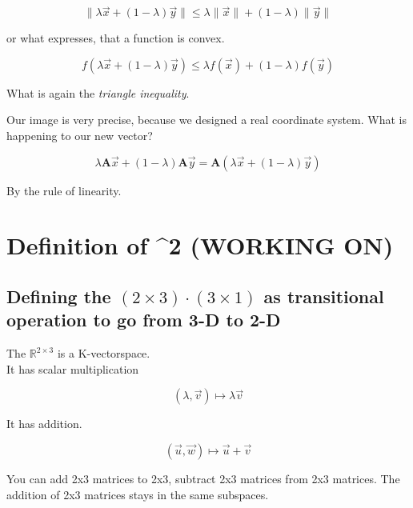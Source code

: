 \documentclass[a4paper]{article}
\begin{document}
\begin{Example}
\begin{displaymath}
\|\lambda\vec{x} + (1-\lambda)\vec{y}\| \leq \lambda\|\vec{x}\| + (1-\lambda)\|\vec{y}\|
\end{displaymath}

or what expresses, that a function is convex.

\begin{displaymath}
f(\lambda\vec{x} + (1-\lambda)\vec{y}) \leq \lambda f(\vec{x}) + (1-\lambda)f(\vec{y})
\end{displaymath}

What is again the \emph{triangle inequality}.

Our image is very precise, because we designed a real coordinate system. What is happening to our new vector? 

\begin{displaymath}
\lambda\boldsymbol{A}\vec{x} + (1-\lambda)\boldsymbol{A}\vec{y} = \boldsymbol{A}(\lambda\vec{x} + (1-\lambda)\vec{y})
\end{displaymath}

By the rule of linearity.


\section{Definition of ^{2} (WORKING ON)}


\subsection{Defining the $(2\times3)\cdot(3\times1)$ as transitional operation to go from 3-D to 2-D}

The $\mathbb{R}^{2\times3}$ is a K-vectorspace. \\

It has scalar multiplication

\begin{displaymath}
(\lambda, \vec{v}) \mapsto \lambda\vec{v} 
\end{displaymath}

It has addition.

\begin{displaymath}
(\vec{u}, \vec{w}) \mapsto \vec{u} + \vec{v}
\end{displaymath}

You can add 2x3 matrices to 2x3, subtract 2x3 matrices from 2x3 matrices.
The addition of 2x3 matrices stays in the same subspaces.\\


\end{Example}
\end{document}
